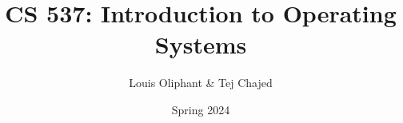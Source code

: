 
\title{CS 537: Introduction to Operating Systems}
\author{Louis Oliphant \& Tej Chajed}
\date{Spring 2024}
